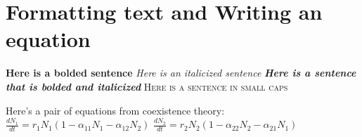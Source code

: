\documentclass[12pt]{article}
\begin{document}
\section{Formatting text and Writing an equation}

\textbf{Here is a bolded sentence}     
\newline
\textit{Here is an italicized sentence}     
\newline
\textit{\textbf{Here is a sentence that is bolded and italicized}}    
\newline
\textsc{Here is a sentence in small caps}   
\newline

Here's a pair of equations from coexistence theory:
\newline
$\frac{dN_{1}}{dt} = r_{1}N_{1} (1 - \alpha_{11}N_{1} - \alpha_{12}N_{2})$
$\frac{dN_{2}}{dt} = r_{2}N_{2} (1 - \alpha_{22}N_{2} - \alpha_{21}N_{1})$



\end{document}
